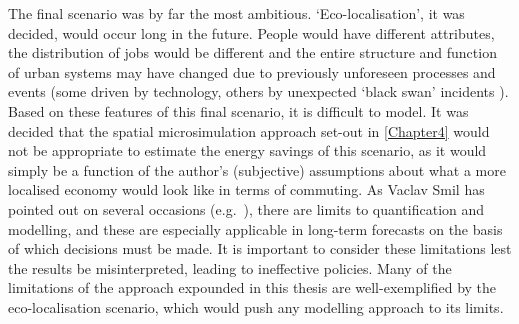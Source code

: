 \documentclass[a4paper, 11pt, twoside]{Thesis}
\begin{document}
\begin{table}[htbp]
\caption[Differences between commuters affected by the `Dutch' and `Finnish' scenarios]
{Differences between commuters affected by the `Dutch' and `Finnish' scenarios, expressed
as averages over all commuters in South Yorkshire}
\label{tdifscens}
\end{table}

The final scenario was by far the most ambitious. `Eco-localisation', it was
decided, would occur long in the future. People would have different
attributes, the distribution of jobs would be different and the
entire structure and function of urban systems may have changed
due to previously unforeseen processes and events (some driven by technology,
others by unexpected `black swan' incidents \citep{Korowicz2011}). Based
on these features of this final scenario, it is difficult to model. It was
decided that the spatial microsimulation approach set-out in \cref{Chapter4}
would not be appropriate to estimate the energy savings of this scenario, as
it would simply be a function of the author's (subjective) assumptions about
what a more localised economy would look like in terms of commuting.
As Vaclav Smil has pointed out on several occasions (e.g.~\citeyear{Smil1993, Smil2010}),
there are limits to quantification and modelling, and these are especially
applicable in long-term forecasts on the basis of which decisions must be made.
It is important to consider these limitations lest the results be misinterpreted,
leading to ineffective policies. Many of the limitations of the approach
expounded in this thesis are well-exemplified by the eco-localisation
scenario, which would push any modelling approach to its limits.
\end{document}
